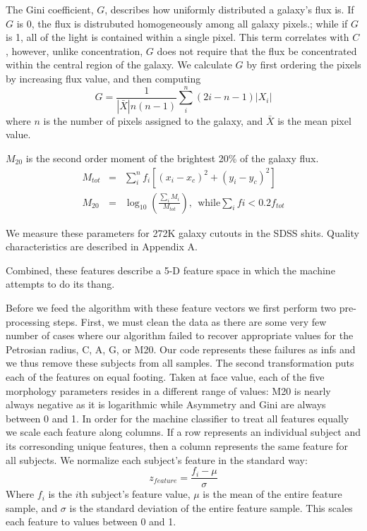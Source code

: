 \documentclass[twocolumn]{aastex6}
\newcommand{\M}[1]{$M_{#1}$}
\begin{document}
The Gini coefficient, $G$, describes how uniformly distributed a galaxy's flux is.  If $G$ is 0, the flux is distrubuted homogeneously among all galaxy pixels.; while if $G$ is 1,  all of the light is contained within a single pixel. This term correlates with $C$, however, unlike concentration, $G$ does not require that the flux be concentrated within the central region of the galaxy.  We calculate $G$ by first ordering the pixels by increasing flux value, and then computing
\begin{equation}
G = \frac{1}{|\bar X|n(n-1)}\sum_i^n(2i-n-1)|X_i|
\end{equation}
where $n$ is the number of pixels assigned to the galaxy, and $\bar X$ is the mean pixel value. 

\M{20} is the second order moment of the brightest 20\% of the galaxy flux. 
\begin{eqnarray}
 M_{tot} & = & \sum_i^nf_i[(x_i-x_c)^2 + (y_i-y_c)^2]  \\
 M_{20} & = & \log_{10} (\frac{\sum_iM_i}{M_{tot}}), ~~\textrm{while} \sum_ifi < 0.2f_{tot}
\end{eqnarray}

We measure these parameters for 272K galaxy cutouts  in the SDSS shits. Quality characteristics are described in Appendix A.  

Combined, these features describe a 5-D feature space in which the machine attempts to do its thang. 

Before we feed the algorithm with these feature vectors we first perform two pre-processing steps. First, we must clean the data as there are some very few number of cases where our algorithm failed to recover appropriate values for the Petrosian radius, C, A, G, or M20. Our code represents these failures as infs and we thus remove these subjects from all samples.  The second transformation puts each of the features on equal footing. Taken at face value, each of the five morphology parameters resides in a different range of values:  M20 is nearly always negative as it is logarithmic while Asymmetry and Gini are always between 0 and 1.  In order for the machine classifier to treat all features equally we scale each feature along columns. If a row represents an individual subject and its corresonding unique features, then a column represents the same feature for all subjects. We normalize each subject's feature in the standard way: 
\begin{equation}
z_{feature} = \frac{f_i - \mu}{\sigma}
\end{equation} 
Where $f_i$ is the $i$th subject's feature value, $\mu$ is the mean of the entire feature sample, and $\sigma$ is the standard deviation of the entire feature sample. This scales each feature to values between 0 and 1. 
\end{document}
